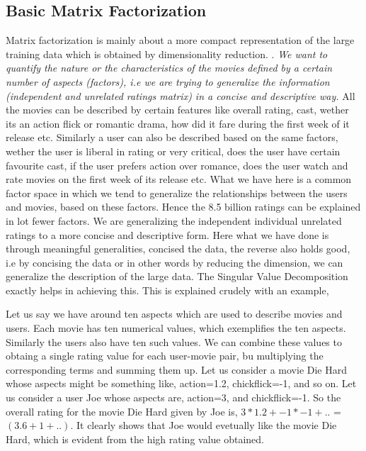 \subsection{Basic Matrix Factorization}
Matrix factorization is mainly about a more compact representation of the large
training data which is obtained by dimensionality reduction.
\cite{Liu:2010:GLA:1821715.1821722}. 
\emph{We want to quantify the nature or the characteristics of the movies
defined by a certain number of aspects (factors), i.e we are trying to
generalize the information (independent and unrelated ratings matrix) in a
concise and descriptive way.} \cite{citeulike:4563139} All the movies can be
described by certain features like overall rating, cast, wether its an action
flick or romantic drama, how did it fare during the first week of it release
etc. Similarly a user can also be described based on the same factors, wether
the user is liberal in rating or very critical, does the user have certain
favourite cast, if the user prefers action over romance, does the user watch and
rate movies on the first week of its release etc. What we have here is a common
factor space in which we tend to generalize the relationships between the users
and movies, based on these factors. Hence the 8.5 billion ratings can be
explained in lot fewer factors. We are generalizing the independent individual
unrelated ratings to a more concise and descriptive form. Here what we have done
is through meaningful generalities, concised the data, the reverse also holds
good, i.e by concising the data or in other words by reducing the dimension, we
can generalize the description of the large data. The Singular Value
Decomposition exactly helps in achieving this. This is explained crudely with an
example,\\

\begin{example}
Let us say we have around ten aspects which are used to describe movies and
users. Each movie has ten numerical values, which exemplifies the ten aspects.
Similarly the users also have ten such values. We can combine these values to
obtaing a single rating value for each user-movie pair, bu multiplying the
corresponding terms and summing them up. Let us consider a movie Die Hard whose
aspects might be something like, action=1.2, chickflick=-1, and so on. Let us
consider a user Joe whose aspects are, action=3, and chickflick=-1. So the
overall rating for the movie Die Hard given by Joe is, $3*1.2+-1*-1+..$ =
$(3.6+1+..)$. It clearly shows that Joe would evetually like the movie Die
Hard, which is evident from the high rating value obtained.   
\end{example}\\

